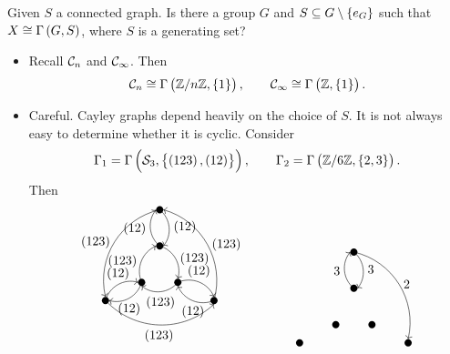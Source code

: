 \begin{exercise}
Given $ S $ a connected graph. Is there a group $ G $ and $ S \subseteq G \setminus \cbr{e_G} $ such that $ X \cong \Gamma\br{G, S} $, where $ S $ is a generating set?
\end{exercise}

\begin{example}
\hfill
\begin{itemize}
\item Recall $ \CCC_n $ and $ \CCC_\infty $. Then
$$ \CCC_n \cong \Gamma\br{\ZZ / n\ZZ, \cbr{1}}, \qquad \CCC_\infty \cong \Gamma\br{\ZZ, \cbr{1}}. $$
\item Careful. Cayley graphs depend heavily on the choice of $ S $. It is not always easy to determine whether it is cyclic. Consider
$$ \Gamma_1 = \Gamma\br{\SSS_3, \cbr{\br{123}, \br{12}}}, \qquad \Gamma_2 = \Gamma\br{\ZZ / 6\ZZ, \cbr{2, 3}}. $$
Then
$$
\begin{array}{ccc}
\begin{tikzpicture}
\fill (0, 0) circle (0.1);
\fill (0, -1) circle (0.1);
\fill (-0.5, -2) circle (0.1);
\fill (0.5, -2) circle (0.1);
\fill (-1.5, -2.5) circle (0.1);
\fill (1.5, -2.5) circle (0.1);
\draw [->] (0, 0) to [bend left=45] node[right]{$ \br{12} $} (0.1, -1);
\draw [->] (0, 0) to [bend right=45] node[left]{$ \br{123} $} (-1.5, -2.4);
\draw [->] (0, -1) to [bend left=45] node[left]{$ \br{12} $} (-0.1, 0);
\draw [->] (0, -1) to [bend left=45] node[right]{$ \br{123} $} (0.5, -1.9);
\draw [->] (-0.5, -2) to [bend left=45] node[left]{$ \br{123} $} (-0.1, -1);
\draw [->] (-0.5, -2) to [bend left=45] node[below]{$ \br{12} $} (-1.4, -2.5);
\draw [->] (0.5, -2) to [bend left=45] node[below]{$ \br{123} $} (-0.5, -2.1);
\draw [->] (0.5, -2) to [bend left=45] node[above]{$ \br{12} $} (1.5, -2.4);
\draw [->] (-1.5, -2.5) to [bend left=45] node[above]{$ \br{12} $} (-0.6, -2);
\draw [->] (-1.5, -2.5) to [bend right=45] node[below]{$ \br{123} $} (1.5, -2.6);
\draw [->] (1.5, -2.5) to [bend right=45] node[right]{$ \br{123} $} (0.1, 0);
\draw [->] (1.5, -2.5) to [bend left=45] node[below]{$ \br{12} $} (0.5, -2.1);
\end{tikzpicture}
& \qquad &
\begin{tikzpicture}
\fill (0, 0) circle (0.1);
\fill (0, -1) circle (0.1);
\fill (-0.5, -2) circle (0.1);
\fill (0.5, -2) circle (0.1);
\fill (-1.5, -2.5) circle (0.1);
\fill (1.5, -2.5) circle (0.1);
\draw [->] (0, 0) to [bend left=45] node[right]{$ 3 $} (0.1, -1);
\draw [->] (0, 0) to [bend left=45] node[right]{$ 2 $} (1.5, -2.4);
\draw [->] (0, -1) to [bend left=45] node[left]{$ 3 $} (-0.1, 0);

\end{tikzpicture}
\end{array}$$
\end{itemize}
\end{example}
